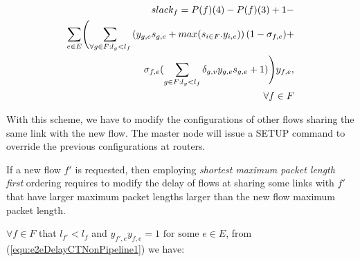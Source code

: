 \documentclass[conference, twocolumn]{IEEEtran}
\theoremstyle{definition}
\begin{document}
\begin{eqnarray}\label{equ:slack1}
	slack_f=P(f)(4)-P(f)(3) + 1 - \notag \\ 
	\sum_{e \in E} \Biggl(\sum_{\forall g \in F:l_g <
l_{f}}\left(y_{g,e}s_{g,e}+max(s_{i \in F}.y_{i,e})\right)(1-\sigma_{f,e}) +
\notag \\ 
\sigma_{f,e}(\sum_{g \in F:l_g <
l_f}\delta_{g,v}y_{g,e}s_{g,e} + 1)\Biggr) y_{f,e}, \notag \\ 
	\forall f \in F
\end{eqnarray}

With this scheme, we have to modify the configurations of other flows sharing
the same link with the new flow. The master node will issue a SETUP command to
override the previous configurations at routers.

If a new flow $f'$ is requested, then employing {\em shortest maximum packet
length first} ordering requires to modify the delay of flows at sharing some
links with $f'$ that have larger maximum packet lengths larger than the new flow
maximum packet length. 

$\forall f \in F$  that $l_{f'} < l_f$ and $y_{f',e}y_{f,e}=1 \mbox{ for some }
e \in E$, from (\ref{equ:e2eDelayCTNonPipeline1}) we have:
\end{document}
